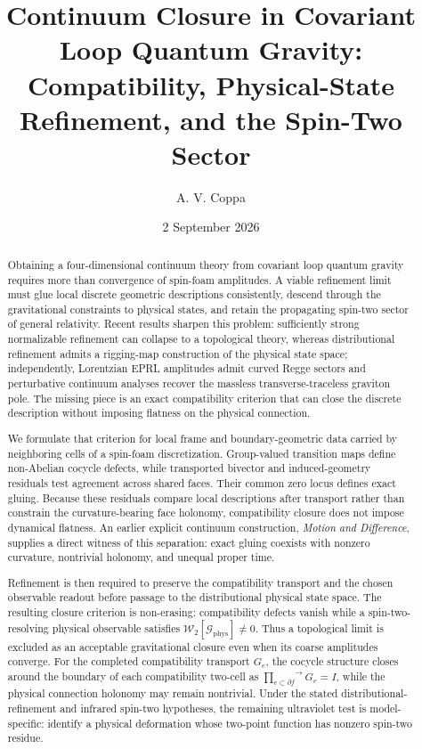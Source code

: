 \documentclass[aps,prd,reprint,nofootinbib,superscriptaddress]{revtex4-2}
\newcommand{\phys}{\mathrm{phys}}
\begin{document}
\title{Continuum Closure in Covariant Loop Quantum Gravity: Compatibility, Physical-State Refinement, and the Spin-Two Sector}

\author{A. V. Coppa}
\date{2 September 2026}

\begin{abstract}
Obtaining a four-dimensional continuum theory from covariant loop quantum gravity requires more than convergence of spin-foam amplitudes. A viable refinement limit must glue local discrete geometric descriptions consistently, descend through the gravitational constraints to physical states, and retain the propagating spin-two sector of general relativity. Recent results sharpen this problem: sufficiently strong normalizable refinement can collapse to a topological theory, whereas distributional refinement admits a rigging-map construction of the physical state space; independently, Lorentzian EPRL amplitudes admit curved Regge sectors and perturbative continuum analyses recover the massless transverse-traceless graviton pole. The missing piece is an exact compatibility criterion that can close the discrete description without imposing flatness on the physical connection.

We formulate that criterion for local frame and boundary-geometric data carried by neighboring cells of a spin-foam discretization. Group-valued transition maps define non-Abelian cocycle defects, while transported bivector and induced-geometry residuals test agreement across shared faces. Their common zero locus defines exact gluing. Because these residuals compare local descriptions after transport rather than constrain the curvature-bearing face holonomy, compatibility closure does not impose dynamical flatness. An earlier explicit continuum construction, \emph{Motion and Difference}, supplies a direct witness of this separation: exact gluing coexists with nonzero curvature, nontrivial holonomy, and unequal proper time.

Refinement is then required to preserve the compatibility transport and the chosen observable readout before passage to the distributional physical state space. The resulting closure criterion is non-erasing: compatibility defects vanish while a spin-two-resolving physical observable satisfies $\mathcal W_2[\mathcal G_{\phys}]\neq0$. Thus a topological limit is excluded as an acceptable gravitational closure even when its coarse amplitudes converge. For the completed compatibility transport $G_e$, the cocycle structure closes around the boundary of each compatibility two-cell as $\overrightarrow{\prod_{e\subset\partial f}}G_e=I$, while the physical connection holonomy may remain nontrivial. Under the stated distributional-refinement and infrared spin-two hypotheses, the remaining ultraviolet test is model-specific: identify a physical deformation whose two-point function has nonzero spin-two residue.
\end{abstract}
\end{document}
